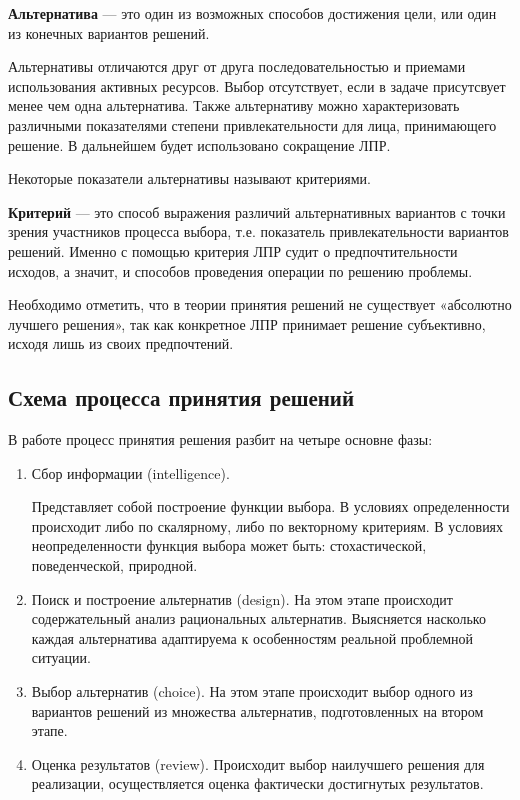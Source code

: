 \textbf{Альтернатива} --- это один из возможных способов достижения цели, или один из конечных вариантов решений.
\par Альтернативы отличаются друг от друга последовательностью  и приемами использования активных ресурсов. Выбор отсутствует, если в задаче присутсвует менее чем одна альтернатива. Также альтернативу можно характеризовать различными показателями степени привлекательности для лица, принимающего решение. В дальнейшем будет использовано сокращение ЛПР.
\par Некоторые показатели альтернативы называют критериями.
\par\textbf{Критерий} --- это способ выражения различий альтернативных вариантов с точки зрения участников процесса выбора, т.е. показатель привлекательности вариантов решений. Именно с помощью критерия ЛПР судит о предпочтительности исходов, а значит, и способов проведения операции по решению проблемы. \cite{bib7}

Необходимо отметить, что в теории принятия решений не существует «абсолютно лучшего решения», так как конкретное ЛПР принимает решение субъективно, исходя лишь из своих предпочтений.

\subsection{Схема процесса принятия решений}

\par В работе \cite{bib3} процесс принятия решения разбит на четыре основне фазы:
\begin{enumerate}[label=\arabic*)]
    \item Сбор информации (intelligence).
    \par Представляет собой построение функции выбора. В условиях определенности происходит либо по скалярному, либо по векторному критериям. В условиях неопределенности функция выбора может быть: стохастической, поведенческой, природной. 
    \item Поиск и построение альтернатив (design).
    На этом этапе происходит содержательный анализ рациональных альтернатив. Выясняется насколько каждая альтернатива адаптируема к особенностям реальной проблемной ситуации.
    \item Выбор альтернатив (choice). На этом этапе происходит выбор одного из вариантов решений из множества альтернатив, подготовленных на втором этапе.
    \item Оценка результатов (review). Происходит выбор наилучшего решения для реализации, осуществляется оценка фактически достигнутых результатов.
\end{enumerate}

